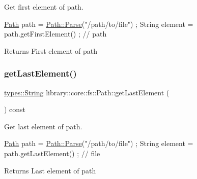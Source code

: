 Get first element of path. 


\begin{DoxyCode}
\hyperlink{classlibrary_1_1core_1_1fs_1_1_path_aaba9a8e0153813f08f78f1c3275734a4}{Path} path = \hyperlink{classlibrary_1_1core_1_1fs_1_1_path_aebf5bd3af83e0b7376616e146f3e55df}{Path::Parse}(\textcolor{stringliteral}{"/path/to/file"}) ;
String element = path.getFirstElement() ; \textcolor{comment}{// path}
\end{DoxyCode}


\begin{DoxyReturn}{Returns}
First element of path 
\end{DoxyReturn}
\mbox{\label{classlibrary_1_1core_1_1fs_1_1_path_a3e29def9459dd51f1c359435aae4ead1}} 
\subsubsection{\texorpdfstring{get\+Last\+Element()}{getLastElement()}}
{\footnotesize\ttfamily \hyperlink{classlibrary_1_1core_1_1types_1_1_string}{types\+::\+String} library\+::core\+::fs\+::\+Path\+::get\+Last\+Element (\begin{DoxyParamCaption}{ }\end{DoxyParamCaption}) const}



Get last element of path. 


\begin{DoxyCode}
\hyperlink{classlibrary_1_1core_1_1fs_1_1_path_aaba9a8e0153813f08f78f1c3275734a4}{Path} path = \hyperlink{classlibrary_1_1core_1_1fs_1_1_path_aebf5bd3af83e0b7376616e146f3e55df}{Path::Parse}(\textcolor{stringliteral}{"/path/to/file"}) ;
String element = path.getLastElement() ; \textcolor{comment}{// file}
\end{DoxyCode}


\begin{DoxyReturn}{Returns}
Last element of path 
\end{DoxyReturn}
\mbox{\label{classlibrary_1_1core_1_1fs_1_1_path_a920b1d062cb1274da811150afafba124}} 
